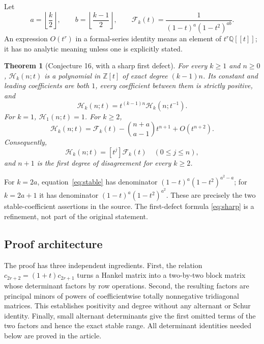 \documentclass[11pt]{article}
\newtheorem{theorem}{Theorem}[section]
\theoremstyle{definition}
\theoremstyle{remark}
\newcommand{\Z}{\mathbb Z}
\newcommand{\Q}{\mathbb Q}
\newcommand{\Ht}{\mathcal H}
\newcommand{\F}{\mathcal F}
\theoremstyle{definition}
\theoremstyle{plain}
\numberwithin{equation}{section}
\begin{document}
Let
\begin{equation}
 a=\left\lfloor\frac k2\right\rfloor,\qquad
 b=\left\lfloor\frac{k-1}{2}\right\rfloor,\qquad
 \F_k(t)=\frac{1}{(1-t)^a(1-t^2)^{ab}}.
 \label{eq:F}
\end{equation}
An expression $O(t^r)$ in a formal-series identity means an element of
$t^r\Q[[t]]$; it has no analytic meaning unless one is explicitly stated.

\begin{theorem}[Conjecture 16, with a sharp first defect]
\label{thm:main}
For every $k\ge1$ and $n\ge0$, $\Ht_k(n;t)$ is a polynomial in $\Z[t]$ of
exact degree $(k-1)n$. Its constant and leading coefficients are both $1$,
every coefficient between them is strictly positive, and
\begin{equation}
 \Ht_k(n;t)=t^{(k-1)n}\Ht_k(n;t^{-1}).
 \label{eq:pal}
\end{equation}
For $k=1$, $\Ht_1(n;t)=1$. For $k\ge2$,
\begin{equation}
 \Ht_k(n;t)=\F_k(t)
 -\binom{n+a}{a-1}t^{n+1}+O(t^{n+2}).
 \label{eq:sharp}
\end{equation}
Consequently,
\begin{equation}
 [t^j]\Ht_k(n;t)=[t^j]\F_k(t)\quad(0\le j\le n),
 \label{eq:stable}
\end{equation}
and $n+1$ is the first degree of disagreement for every $k\ge2$.
\end{theorem}

For $k=2a$, equation~\eqref{eq:stable} has denominator
$(1-t)^a(1-t^2)^{a^2-a}$; for $k=2a+1$ it has denominator
$(1-t)^a(1-t^2)^{a^2}$. These are precisely the two stable-coefficient
assertions in the source. The first-defect formula \eqref{eq:sharp} is a
refinement, not part of the original statement.

\subsection{Proof architecture}
The proof has three independent ingredients. First, the relation
$c_{2r+2}=(1+t)c_{2r+1}$ turns a Hankel matrix into a two-by-two block matrix
whose determinant factors by row operations. Second, the resulting factors
are principal minors of powers of coefficientwise totally nonnegative
tridiagonal matrices. This establishes positivity and degree without any
alternant or Schur identity. Finally, small alternant determinants give the
first omitted terms of the two factors and hence the exact stable range.
All determinant identities needed below are proved in the article.
\end{document}
